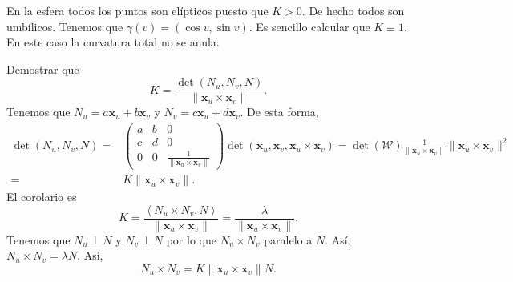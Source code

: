  \begin{eg}
 En la esfera todos los puntos son elípticos puesto que $\displaystyle K > 0 $. De hecho todos son umbílicos. Tenemos que $\displaystyle \gamma\left(v\right)=\left(\cos v, \sin v\right) $. Es sencillo calcular que $\displaystyle K\equiv 1 $. En este caso la curvatura total no se anula. 
 \end{eg}
\begin{eg}
	Demostrar que 
	\[K = \frac{\det\left(N_{u}, N_{v}, N\right)}{\| \textbf{x} _{u} \times \textbf{x} _{v}\|} .\]
	Tenemos que $\displaystyle N_{u}= a \textbf{x} _{u} + b \textbf{x} _{v} $ y $\displaystyle N_{v}= c \textbf{x} _{u} + d \textbf{x} _{v}$. De esta forma, 
	\[
	\begin{split}
		\det\left(N_{u}, N_{v}, N\right)= & \begin{pmatrix} a & b & 0 \\ c & d & 0 \\ 0 & 0 & \frac{1}{\| \textbf{x} _{u} \times \textbf{x} _{v}\|} \end{pmatrix}\det\left( \textbf{x} _{u}, \textbf{x} _{v}, \textbf{x} _{u}\times \textbf{x} _{v}\right) = \det\left(\mathcal{W}\right)\frac{1}{\| \textbf{x} _{u}\times \textbf{x} _{v}\|}\| \textbf{x} _{u} \times \textbf{x} _{v}\|^{2}\\
		= & K\| \textbf{x} _{u} \times \textbf{x} _{v}\| .
	\end{split}
	\]
	El corolario es 
	\[K = \frac{\left\langle N_{u} \times N_{v}, N \right\rangle }{\| \textbf{x} _{u} \times \textbf{x} _{v}\|}= \frac{\lambda }{\| \textbf{x} _{u} \times \textbf{x} _{v}\|} .\]
	Tenemos que $\displaystyle N_{u}\perp N $ y $\displaystyle N_{v}\perp N $ por lo que $\displaystyle N_{u}\times N_{v}$ paralelo a $\displaystyle N $. Así, $\displaystyle N_{u} \times N_{v}=\lambda N $. Así, 
	\[N_{u} \times N_{v} = K\| \textbf{x} _{u} \times \textbf{x} _{v}\|N .\]
\end{eg}

